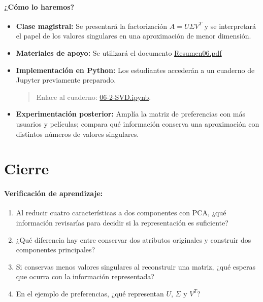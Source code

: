 \documentclass[a4,11pt]{aleph-notas}
\begin{document}
\paragraph{¿Cómo lo haremos?}  
\begin{itemize}[leftmargin=*]
    \item \textbf{Clase magistral:}  
    Se presentará la factorización $A=U\Sigma V^T$ y se interpretará el papel de los valores singulares en una aproximación de menor dimensión.

    \item \textbf{Materiales de apoyo:} 
    Se utilizará el documento \href{https://andres-merino.github.io/AprendizajeAutomaticoInicial-05-N0105/2-Resumenes/Resumen06.pdf}{Resumen06.pdf}
    
    \item \textbf{Implementación en Python:} Los estudiantes accederán a un cuaderno de Jupyter previamente preparado.
    \begin{quote}
        Enlace al cuaderno: \href{https://github.com/andres-merino/AprendizajeAutomaticoInicial-05-N0105/blob/main/2-Notebooks/06-2-SVD.ipynb}{06-2-SVD.ipynb}.
    \end{quote}
    
    \item \textbf{Experimentación posterior:} Amplía la matriz de preferencias con más usuarios y películas; compara qué información conserva una aproximación con distintos números de valores singulares.
    
\end{itemize}


\section*{Cierre}

\paragraph{Verificación de aprendizaje:} 
\begin{enumerate}[leftmargin=*]
    \item Al reducir cuatro características a dos componentes con PCA, ¿qué información revisarías para decidir si la representación es suficiente?
    
    \item ¿Qué diferencia hay entre conservar dos atributos originales y construir dos componentes principales?
    
    \item Si conservas menos valores singulares al reconstruir una matriz, ¿qué esperas que ocurra con la información representada?

    \item En el ejemplo de preferencias, ¿qué representan $U$, $\Sigma$ y $V^T$?
\end{enumerate}
\end{document}
